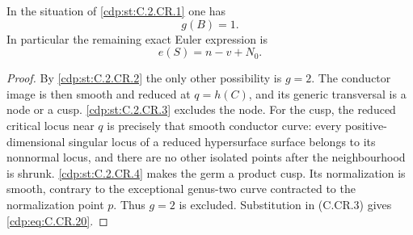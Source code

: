 
\begin{proposition}\label{cdp:st:C.2.CR.5}
In the situation of \ref{cdp:st:C.2.CR.1} one has
\[
                              g(B)=1.              \tag{C.CR.19}\label{cdp:eq:C.CR.19}
\]
In particular the remaining exact Euler expression is
\[
                            e(S)=n-v+N_0.          \tag{C.CR.20}\label{cdp:eq:C.CR.20}
\]
\end{proposition}
\begin{proof}
By \ref{cdp:st:C.2.CR.2} the only other possibility is $g=2$.
The conductor image is then smooth and reduced at
$q=h(C)$, and its generic transversal is a node or
a cusp. \ref{cdp:st:C.2.CR.3} excludes the node. For the cusp,
the reduced critical locus near $q$ is precisely
that smooth conductor curve: every positive-dimensional
singular locus of a reduced hypersurface surface
belongs to its nonnormal locus, and there are no
other isolated points after the neighbourhood is
shrunk. \ref{cdp:st:C.2.CR.4} makes the germ a product cusp.
Its normalization is smooth, contrary to the
exceptional genus-two curve contracted to the
normalization point $p$. Thus $g=2$ is excluded.
Substitution in (C.CR.3) gives \eqref{cdp:eq:C.CR.20}.
\end{proof}


